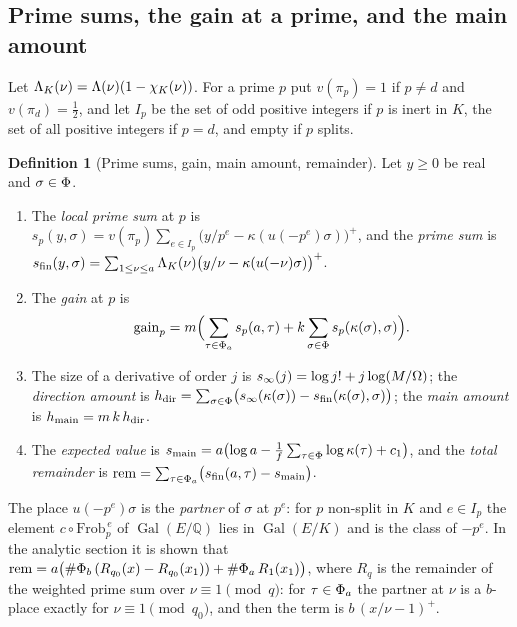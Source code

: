 \documentclass[10pt]{amsart}
\theoremstyle{definition}
\newtheorem{definition}[theorem]{Definition}
\theoremstyle{remark}
\newcommand{\Q}{\mathbb Q}
\begin{document}
\subsection{Prime sums, the gain at a prime, and the main amount}\label{ss:au-primes}

Let $\Lambda_K(\nu)=\Lambda(\nu)(1-\chi_K(\nu))$. For a prime $p$ put $v(\pi_p)=1$ if $p\ne d$ and
$v(\pi_d)=\tfrac12$, and let $I_p$ be the set of odd positive integers if $p$ is inert in $K$, the
set of all positive integers if $p=d$, and empty if $p$ splits.

\begin{definition}[Prime sums, gain, main amount, remainder]\label{def:au-hmain}
Let $y\ge0$ be real and $\sigma\in\Phi$.
\begin{enumerate}
\item[(a)] The \emph{local prime sum} at $p$ is
$s_p(y,\sigma)=v(\pi_p)\sum_{e\in I_p}\bigl(y/p^e-\kappa(u(-p^e)\sigma)\bigr)^+$, and the
\emph{prime sum} is
$s_{\mathrm{fin}}(y,\sigma)=\sum_{1\le\nu\le a}\Lambda_K(\nu)\bigl(y/\nu-\kappa(u(-\nu)\sigma)\bigr)^+$.
\item[(b)] The \emph{gain} at $p$ is
\[
\operatorname{gain}_p=m\Bigl(\sum_{\tau\in\Phi_a}s_p(a,\tau)+k\sum_{\sigma\in\Phi}s_p(\kappa(\sigma),\sigma)
\Bigr).
\]
\item[(c)] The size of a derivative of order $j$ is $s_\infty(j)=\log j!+j\log(M/\Omega)$; the
\emph{direction amount} is $h_{\mathrm{dir}}=\sum_{\sigma\in\Phi}\bigl(s_\infty(\kappa(\sigma))-
s_{\mathrm{fin}}(\kappa(\sigma),\sigma)\bigr)$; the \emph{main amount} is $h_{\mathrm{main}}=m\,k\,h_{\mathrm{dir}}$.
\item[(d)] The \emph{expected value} is
$s_{\mathrm{main}}=a\bigl(\log a-\tfrac1f\sum_{\tau\in\Phi}\log\kappa(\tau)+c_1\bigr)$, and the
\emph{total remainder} is $\operatorname{rem}=\sum_{\tau\in\Phi_a}\bigl(s_{\mathrm{fin}}(a,\tau)-s_{\mathrm{main}}\bigr)$.
\end{enumerate}
\end{definition}

The place $u(-p^e)\sigma$ is the \emph{partner} of $\sigma$ at $p^e$: for $p$ non-split in $K$
and $e\in I_p$ the element $c\circ\mathrm{Frob}_p^{\,e}$ of $\operatorname{Gal}(E/\Q)$ lies in
$\operatorname{Gal}(E/K)$ and is the class of $-p^e$. In the analytic section it is shown that
$\operatorname{rem}=a\bigl(\#\Phi_b\,(R_{q_0}(x)-R_{q_0}(x_1))+\#\Phi_a\,R_1(x_1)\bigr)$, where $R_q$ is the
remainder of the weighted prime sum over $\nu\equiv1\pmod q$: for $\tau\in\Phi_a$ the partner at
$\nu$ is a $b$-place exactly for $\nu\equiv1\pmod{q_0}$, and then the term is
$b\,(x/\nu-1)^+$.
\end{document}
